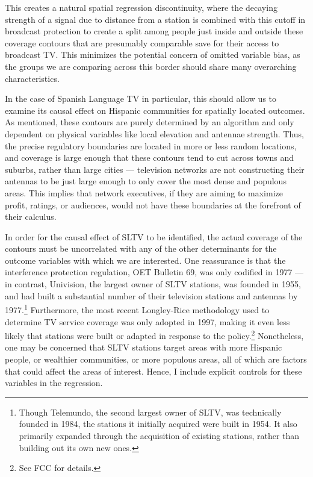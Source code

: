\documentclass[11pt]{article}
\begin{document}
This creates a natural spatial regression discontinuity, where the decaying strength of a signal due to distance from a station is combined with this cutoff in broadcast protection to create a split among people just inside and outside these coverage contours that are presumably comparable save for their access to broadcast TV.  This minimizes the potential concern of omitted variable bias, as the groups we are comparing across this border should share many overarching characteristics.

In the case of Spanish Language TV in particular, this should allow us to examine its causal effect on Hispanic communities for spatially located outcomes. As mentioned, these contours are purely determined by an algorithm and only dependent on physical variables like local elevation and antennae strength. Thus, the precise regulatory boundaries are located in more or less random locations, and coverage is large enough that these contours tend to cut across towns and suburbs, rather than large cities --- television networks are not constructing their antennas to be just large enough to only cover the most dense and populous areas. This implies that network executives, if they are aiming to maximize profit, ratings, or audiences, would not have these boundaries at the forefront of their calculus.

In order for the causal effect of SLTV to be identified, the actual coverage of the contours must be uncorrelated with any of the other determinants for the outcome variables with which we are interested. One reassurance is that the interference protection regulation, OET Bulletin 69, was only codified in 1977 --- in contrast, Univision, the largest owner of SLTV stations, was founded in 1955, and had built a substantial number of their television stations and antennas by 1977.\footnote{ Though Telemundo, the second largest owner of SLTV, was technically founded in 1984, the stations it initially acquired were built in 1954. It also primarily expanded through the acquisition of existing stations, rather than building out its own new ones. } Furthermore, the most recent Longley-Rice methodology used to determine TV service coverage was only adopted in 1997, making it even less likely that stations were built or adapted in response to the policy.\footnote{ See FCC\cite{noauthor_oet_2004} for details.} Nonetheless, one may be concerned that SLTV stations target areas with more Hispanic people, or wealthier communities, or more populous areas, all of which are factors that could affect the areas of interest. Hence, I include explicit controls for these variables in the regression.
\end{document}
